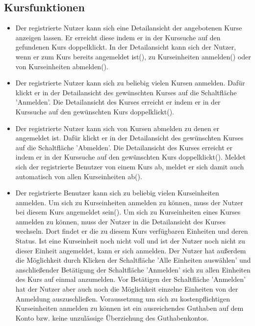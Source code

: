 \documentclass[a4paper]{scrreprt}
\begin{document}
\subsection{Kursfunktionen}
\begin{itemize}
	\item {}
	Der registrierte Nutzer kann sich eine Detailansicht der angebotenen Kurse anzeigen lassen. Er erreicht diese indem er in der Kurssuche auf den gefundenen Kurs doppelklickt. In der Detailansicht kann sich der Nutzer, wenn er zum Kurs bereits angemeldet ist(), zu Kurseinheiten anmelden() oder von Kurseinheiten abmelden().
	\item {} 
	Der registrierte Nutzer kann sich zu beliebig vielen Kursen anmelden. 
	Dafür klickt er in der Detailansicht des gewünschten Kurses auf die Schaltfläche 'Anmelden'. Die Detailansicht des Kurses erreicht er indem er in der Kurssuche auf den gewünschten Kurs doppelklickt().
	\item {} 
	Der registrierte Nutzer kann sich von Kursen abmelden zu denen er angemeldet ist. Dafür klickt er in der Detailansicht des gewünschten Kurses auf die Schaltfläche 'Abmelden'. Die Detailansicht des Kurses erreicht er indem er in der Kurssuche auf den gewünschten Kurs doppelklickt(). Meldet sich der registrierte Benutzer von einem Kurs ab, meldet er sich damit auch automatisch von allen Kurseinheiten ab().
	\item {}
	Der registrierte Benutzer kann sich zu beliebig vielen Kurseinheiten anmelden. Um sich zu Kurseinheiten anmelden zu können, muss der Nutzer bei diesem Kurs angemeldet sein().
	Um sich zu Kurseinheiten eines Kurses anmelden zu können, muss der Nutzer in die Detailansicht des Kurses wechseln. Dort findet er die zu diesem Kurs verfügbaren Einheiten und deren Status. Ist eine Kurseinheit noch nicht voll und ist der Nutzer noch nicht zu dieser Einheit angemeldet, kann er sich anmelden. Der Nutzer hat außerdem die Möglichkeit durch Klicken der Schaltfläche 'Alle Einheiten auswählen' und anschließender Betätigung der Schaltfläche 'Anmelden' sich zu allen Einheiten des Kurs auf einmal anzumelden. Vor Betätigen der Schaltfläche 'Anmelden' hat der Nutzer aber auch noch die Möglichkeit einzelne Einheiten von der Anmeldung auszuschließen. Voraussetzung um sich zu kostenpflichtigen Kurseinheiten anmelden zu können ist ein ausreichendes Guthaben auf dem Konto bzw. keine unzulässige Überziehung des Guthabenkontos.

\end{itemize}
\end{document}
